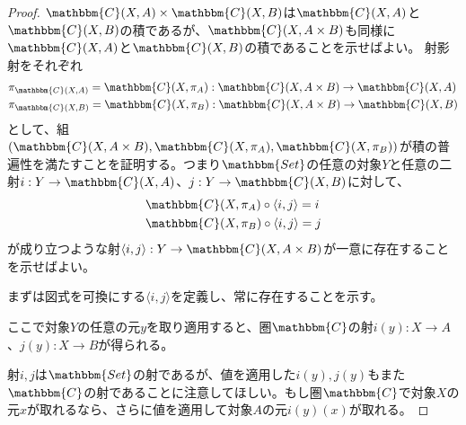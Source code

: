 \documentclass[uplatex,dvipdfmx]{jsarticle}
\newcommand{\cat}[1]{\mathbbm{#1}}
\newcommand{\arrow}{\rightarrow}
\newcommand{\tuple}[1]{\langle #1\rangle}
\newcommand{\mor}[3]{#1:#2\arrow #3}
\newcommand{\arset}[3]{\cat{#1}(#2,#3)}
\newtheorem{proof}{証明}[section]
\numberwithin{proof}{subsection}
\numberwithin{prop}{subsection}
\numberwithin{define}{subsection}
\begin{document}
	\begin{proof}
		$\arset{C}{X}{A}\times\arset{C}{X}{B}$は$\arset{C}{X}{A}$と$\arset{C}{X}{B}$の積であるが、$\arset{C}{X}{A\times B}$も同様に$\arset{C}{X}{A}$と$\arset{C}{X}{B}$の積であることを示せばよい。
		射影射をそれぞれ
		\begin{align*}
			&\pi_{\arset{C}{X}{A}}=\mor{\arset{C}{X}{\pi_A}}{\arset{C}{X}{A\times B}}{\arset{C}{X}{A}}\\
			&\pi_{\arset{C}{X}{B}}=\mor{\arset{C}{X}{\pi_B}}{\arset{C}{X}{A\times B}}{\arset{C}{X}{B}}
		\end{align*}
		として、組$(\arset{C}{X}{A\times B},\arset{C}{X}{\pi_A},\arset{C}{X}{\pi_B})$が積の普遍性を満たすことを証明する。つまり$\cat{Set}$の任意の対象$Y$と任意の二射$\mor{i}{Y}{\arset{C}{X}{A}}$、$\mor{j}{Y}{\arset{C}{X}{B}}$に対して、
		\begin{align*}
			&\arset{C}{X}{\pi_A}\circ\tuple{i,j}=i\\
			&\arset{C}{X}{\pi_B}\circ\tuple{i,j}=j
		\end{align*}
		が成り立つような射$\mor{\tuple{i,j}}{Y}{\arset{C}{X}{A\times B}}$が一意に存在することを示せばよい。

		まずは図式を可換にする$\tuple{i,j}$を定義し、常に存在することを示す。
		\begin{center}
		\end{center}
		ここで対象$Y$の任意の元$y$を取り適用すると、圏$\cat{C}$の射$\mor{i(y)}{X}{A}$、$\mor{j(y)}{X}{B}$が得られる。

		射$i,j$は$\cat{Set}$の射であるが、値を適用した$i(y),j(y)$もまた$\cat{C}$の射であることに注意してほしい。もし圏$\cat{C}$で対象$X$の元$x$が取れるなら、さらに値を適用して対象$A$の元$i(y)(x)$が取れる。


\end{proof}
\end{document}
